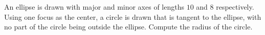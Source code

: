 An ellipse is drawn with major and minor axes of lengths $10$ and $8$ respectively. Using one focus as the center, a circle is drawn that is tangent to the ellipse, with no part of the circle being outside the ellipse. Compute the radius of the circle.
